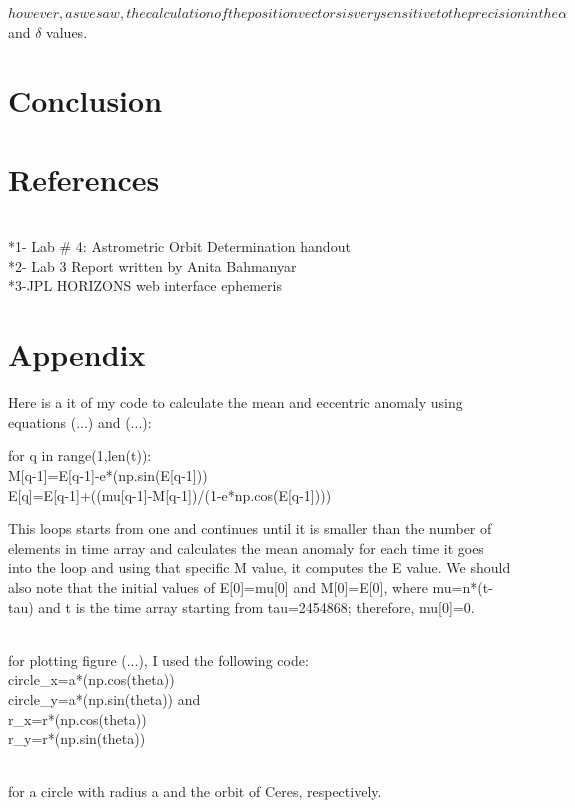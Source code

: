 \documentclass[letterpaper,12pt]{article}
\begin{document}
\begin{math}
however, as we saw, the calculation of the position vectors is very sensitive to the precision in the \alpha \end{math} and \begin{math} \delta \end{math} values. 


\section{Conclusion}
\label{sec:conclusion}


\section{References}
\label{sec:references}
\\*1- Lab # 4: Astrometric Orbit Determination handout
\\*2- Lab 3 Report written by Anita Bahmanyar
\\*3-JPL HORIZONS web interface ephemeris

\section{Appendix}
\label{sec:appendix}
Here is a it of my code to calculate the mean and eccentric anomaly using equations (...) and  (...):

for q in range(1,len(t)):
\\       M[q-1]=E[q-1]-e*(np.sin(E[q-1]))
\\       E[q]=E[q-1]+((mu[q-1]-M[q-1])/(1-e*np.cos(E[q-1]))) 
   
This loops starts from one and continues until it is smaller than the number of elements in time array and calculates the mean anomaly for each time it goes into the loop and using that specific M value, it computes the E value. We should also note that the initial values of E[0]=mu[0] and M[0]=E[0], where mu=n*(t-tau) and t is the time array starting from tau=2454868; therefore, mu[0]=0.
    

\\for plotting figure (...), I used the following code:
\\circle_x=a*(np.cos(theta))
\\circle_y=a*(np.sin(theta))
 and 
\\r_x=r*(np.cos(theta))
\\r_y=r*(np.sin(theta))
 
\\for a circle with radius a and the orbit of Ceres, respectively.
\end{document}
